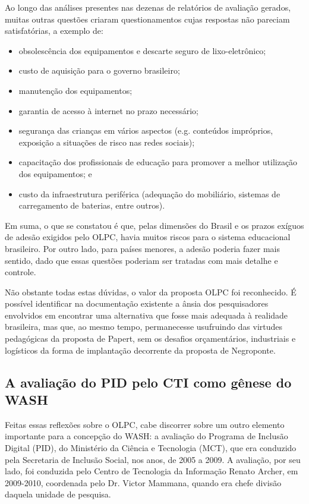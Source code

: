 Ao longo das análises presentes nas dezenas de relatórios de avaliação gerados, muitas outras questões criaram questionamentos cujas respostas não pareciam satisfatórias, a exemplo de:


\begin{itemize}
\item obsolescência dos equipamentos e descarte seguro de lixo-eletrônico;
\item custo de aquisição para o governo brasileiro;
\item manutenção dos equipamentos;
\item garantia de acesso à internet no prazo necessário;
\item segurança das crianças em vários aspectos (e.g. conteúdos impróprios, exposição a situações de risco nas redes sociais);
\item capacitação dos profissionais de educação para promover a melhor utilização dos equipamentos; e
\item custo da infraestrutura periférica (adequação do mobiliário, sistemas de carregamento de baterias, entre outros).
\end{itemize}

Em suma, o que se constatou é que, pelas dimensões do Brasil e os prazos exíguos de adesão exigidos pelo OLPC, havia muitos riscos para o sistema educacional brasileiro. Por outro lado, para países menores, a adesão poderia fazer mais sentido, dado que essas questões poderiam ser tratadas com mais detalhe e controle.

Não obstante todas estas dúvidas, o valor da proposta OLPC foi reconhecido. É possível identificar na documentação existente a ânsia dos pesquisadores envolvidos em encontrar uma alternativa que fosse mais adequada à realidade brasileira, mas que, ao mesmo tempo, permanecesse usufruindo das virtudes pedagógicas da proposta de Papert, sem os desafios orçamentários, industriais e logísticos da forma de implantação decorrente da proposta de Negroponte.

\subsection[A avaliação do PID pelo CTI como gênese do WASH]{A avaliação do PID pelo CTI como gênese do WASH}\label{A avaliação do PID pelo CTI como gênese do WASH}
Feitas essas reflexões sobre o OLPC, cabe discorrer sobre um outro elemento importante para a concepção do WASH: a avaliação do Programa de Inclusão Digital (PID), do Ministério da Ciência e Tecnologia (MCT), que era conduzido pela Secretaria de Inclusão Social, nos anos, de 2005 a 2009. A avaliação, por seu lado, foi conduzida pelo Centro de Tecnologia da Informação Renato Archer, em 2009-2010, coordenada pelo Dr. Victor Mammana, quando era chefe divisão daquela unidade de pesquisa.

